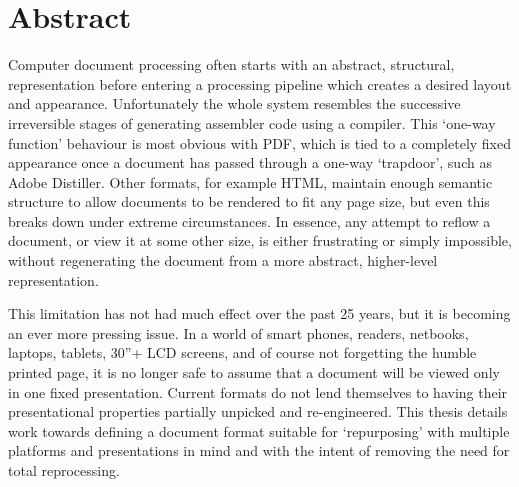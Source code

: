 \begingroup
\let\clearpage\relax
\let\cleardoublepage\relax
\let\cleardoublepage\relax

\chapter*{Abstract}
Computer document processing often starts with an abstract, structural, representation before
entering a processing pipeline which creates a desired layout and appearance. Unfortunately the
whole system resembles the successive irreversible stages of generating assembler code using a
compiler. This `one-way function' behaviour is most obvious with PDF, which is tied to a completely
fixed appearance once a document has passed through a one-way `trapdoor', such as Adobe Distiller.
Other formats, for example HTML, maintain enough semantic structure to allow documents to be
rendered to fit any page size, but even this breaks down under extreme circumstances. In essence,
any attempt to reflow a document, or view it at some other size, is either frustrating or simply
impossible, without regenerating the document from a more abstract, higher-level representation.

This limitation has not had much effect over the past 25 years, but it is becoming an ever more
pressing issue. In a world of smart phones, \ebook{} readers, netbooks, laptops, tablets,
30''+ LCD screens, and of course not forgetting the humble printed page, it is no longer
safe to assume that a document will be viewed only in one fixed presentation. Current formats do not
lend themselves to having their presentational properties partially unpicked and re-engineered. This
thesis details work towards defining a document format suitable for `repurposing' with multiple
platforms and presentations in mind and with the intent of removing the need for total reprocessing.

\endgroup

\vfill